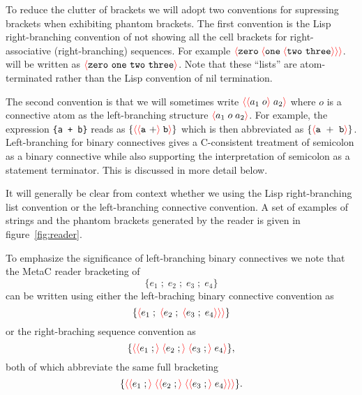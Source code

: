 \documentclass{article}
\newcommand{\mtt}[1]{\mbox{\tt #1}}
\newcommand{\fopen}{{\color{red} \langle}}
\newcommand{\fclose}{{\color{red} \rangle}}
\begin{document}
To reduce the clutter of brackets we will adopt two conventions for supressing brackets when exhibiting phantom brackets.
The first convention is the Lisp right-branching convention of not showing all the cell brackets for right-associative (right-branching) sequences.
For example $\fopen \mathtt{zero}\;\fopen \mathtt{one}\;\fopen \mathtt{two~three}\fclose \fclose \fclose$.
will be written as $\fopen\mathtt{zero~one~two~three}\fclose$.  Note that these ``lists'' are atom-terminated rather than the Lisp convention of
nil termination.

The second convention is that we will sometimes write $\fopen \fopen a_1 \;o\fclose\;a_2\fclose$ where $o$ is a connective atom
as the left-branching structure $\fopen a_1\;o\;a_2 \fclose$.  For example, the expression \mtt{\{a + b\}} reads as
$\{\fopen \fopen \mathtt{a~+} \fclose \;\mathtt{b} \fclose \}$ which is then abbreviated as
$\{\fopen \mathtt{a~+~b} \fclose \}$.  Left-branching for binary connectives gives a
C-consistent treatment of semicolon as a binary connective while also supporting the interpretation of semicolon as a statement terminator.
This is discussed in more detail below.

It will generally be clear from context whether we using the Lisp right-branching list convention
or the left-branching connective convention.
A set of examples of strings and the phantom brackets generated by the reader is given in figure~\ref{fig:reader}.


To emphasize the significance of left-branching binary connectives we note that
the MetaC reader bracketing of
$$\{e_1\;;\;e_2\;;\;e_3\;;\;e_4\}$$
can be written using either the left-braching binary connective convention as
$$\{\fopen e_1\;;\;\fopen e_2\;;\;\fopen e_3\;;\;e_4\fclose\fclose\fclose\}$$
or the right-braching sequence convention as
$$\{\fopen \fopen e_1\;;\fclose \;\fopen e_2\;;\fclose \;\fopen e_3\;;\fclose\;e_4\fclose\},$$
both of which abbreviate the same full bracketing
$$\{\fopen \fopen e_1\;;\fclose \;\fopen \fopen e_2\;;\fclose \;\fopen \fopen e_3\;;\fclose\;e_4\fclose\fclose\fclose\}.$$
\end{document}
